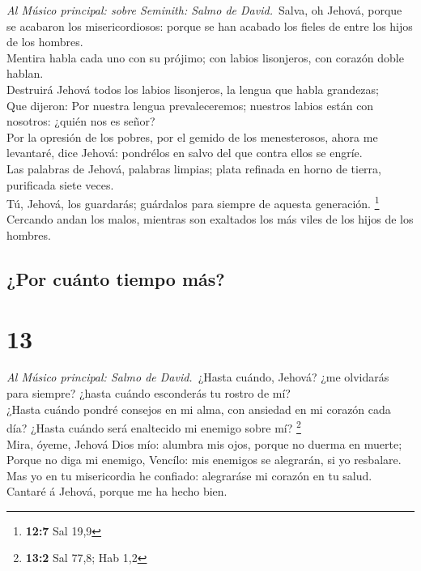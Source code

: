  \emph{Al Músico principal: sobre Seminith: Salmo de
David.}~Salva, oh Jehová, porque se acabaron los misericordiosos: porque
se han acabado los fieles de entre los hijos de los hombres.\\
 Mentira habla cada uno con su prójimo; con labios
lisonjeros, con corazón doble hablan.\\
 Destruirá Jehová todos los labios lisonjeros, la lengua que
habla grandezas;\\
 Que dijeron: Por nuestra lengua prevaleceremos; nuestros
labios están con nosotros: ¿quién nos es señor?\\
 Por la opresión de los pobres, por el gemido de los
menesterosos, ahora me levantaré, dice Jehová: pondrélos en salvo del
que contra ellos se engríe.\\
 Las palabras de Jehová, palabras limpias; plata refinada en
horno de tierra, purificada siete veces.\\
 Tú, Jehová, los guardarás; guárdalos para siempre de
aquesta generación. \footnote{\textbf{12:7} Sal 19,9}\\
 Cercando andan los malos, mientras son exaltados los más
viles de los hijos de los hombres.

\hypertarget{por-cuuxe1nto-tiempo-muxe1s}{%
\subsection{¿Por cuánto tiempo más?}\label{por-cuuxe1nto-tiempo-muxe1s}}

\hypertarget{section-12}{%
\section{13}\label{section-12}}

 \emph{Al Músico principal: Salmo de David.}~¿Hasta cuándo,
Jehová? ¿me olvidarás para siempre? ¿hasta cuándo esconderás tu rostro
de mí?\\
 ¿Hasta cuándo pondré consejos en mi alma, con ansiedad en
mi corazón cada día? ¿Hasta cuándo será enaltecido mi enemigo sobre mí?
\footnote{\textbf{13:2} Sal 77,8; Hab 1,2}\\
 Mira, óyeme, Jehová Dios mío: alumbra mis ojos, porque no
duerma en muerte;\\
 Porque no diga mi enemigo, Vencílo: mis enemigos se
alegrarán, si yo resbalare.\\
 Mas yo en tu misericordia he confiado: alegraráse mi
corazón en tu salud.\\
 Cantaré á Jehová, porque me ha hecho bien.


